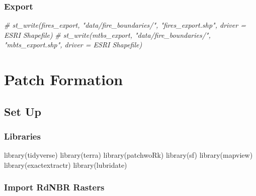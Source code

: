 \documentclass[
]{book}
\newenvironment{Shaded}{\begin{snugshade}}{\end{snugshade}}
\newcommand{\CommentTok}[1]{\textcolor[rgb]{0.56,0.35,0.01}{\textit{#1}}}
\newcommand{\FunctionTok}[1]{\textcolor[rgb]{0.00,0.00,0.00}{#1}}
\newcommand{\NormalTok}[1]{#1}
\begin{document}
\hypertarget{export}{%
\subsection{Export}\label{export}}

\begin{Shaded}
\begin{Highlighting}[]
\CommentTok{\# st\_write(fires\_export, "data/fire\_boundaries/", "fires\_export.shp", driver = \textquotesingle{}ESRI Shapefile\textquotesingle{})}
\CommentTok{\# st\_write(mtbs\_export, "data/fire\_boundaries/", "mbts\_export.shp", driver = \textquotesingle{}ESRI Shapefile\textquotesingle{})}
\end{Highlighting}
\end{Shaded}

\hypertarget{patch-formation}{%
\chapter{Patch Formation}\label{patch-formation}}

\hypertarget{set-up-1}{%
\section{Set Up}\label{set-up-1}}

\hypertarget{libraries-1}{%
\subsection{Libraries}\label{libraries-1}}

\begin{Shaded}
\begin{Highlighting}[]
\FunctionTok{library}\NormalTok{(tidyverse)}
\FunctionTok{library}\NormalTok{(terra)}
\FunctionTok{library}\NormalTok{(patchwoRk)}
\FunctionTok{library}\NormalTok{(sf)}
\FunctionTok{library}\NormalTok{(mapview)}
\FunctionTok{library}\NormalTok{(exactextractr)}
\FunctionTok{library}\NormalTok{(lubridate)}
\end{Highlighting}
\end{Shaded}

\hypertarget{import-rdnbr-rasters}{%
\subsection{Import RdNBR Rasters}\label{import-rdnbr-rasters}}
\end{document}
